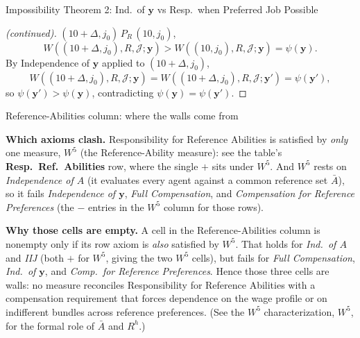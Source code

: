 \documentclass[10pt]{beamer}
\begin{document}
\begin{frame}[allowframebreaks]{Impossibility Theorem 2: Ind.\ of $\mathbf y$ vs Resp.\ when Preferred Job Possible}
\begin{proof}[(continued)]
$(10+\Delta,j_0)\,P_R\,(10,j_0)$,
\begin{equation*}
W((10+\Delta,j_0),R,\mathcal J;\mathbf y)>W((10,j_0),R,\mathcal J;\mathbf y)
=\psi(\mathbf y).
\end{equation*}
By Independence of $\mathbf y$ applied to $(10+\Delta,j_0)$,
\begin{equation*}
W((10+\Delta,j_0),R,\mathcal J;\mathbf y)
=W((10+\Delta,j_0),R,\mathcal J;\mathbf y')=\psi(\mathbf y'),
\end{equation*}
so $\psi(\mathbf y')>\psi(\mathbf y)$, contradicting $\psi(\mathbf
y)=\psi(\mathbf y')$.
\end{proof}

\medskip
\hyperlink{tab:classification}{}
\end{frame}

\begin{frame}[allowframebreaks]{Reference-Abilities column: where the walls come from}
\hypertarget{imp:refabil}{}%
\hyperlink{tab:classification}{}

\scriptsize
\normalsize
\textbf{Which axioms clash.} Responsibility for Reference Abilities is satisfied by
\emph{only} one measure, $W^5$ (the Reference-Ability measure): see the table's
\textbf{Resp.\ Ref.\ Abilities} row, where the single $+$ sits under $W^5$.
And $W^5$ rests on \emph{Independence of $A$} (it evaluates every agent against a
common reference set $\bar A$), so it fails \emph{Independence of $\mathbf y$},
\emph{Full Compensation}, and \emph{Compensation for Reference Preferences}
(the $-$ entries in the $W^5$ column for those rows).

\medskip
\textbf{Why those cells are empty.} A cell in the Reference-Abilities column is
nonempty only if its row axiom is \emph{also} satisfied by $W^5$. That holds for
\emph{Ind.\ of $A$} and \emph{IIJ} (both $+$ for $W^5$, giving the two $W^5$
cells), but fails for \emph{Full Compensation}, \emph{Ind.\ of $\mathbf y$}, and
\emph{Comp.\ for Reference Preferences}. Hence those three cells are walls: no
measure reconciles Responsibility for Reference Abilities with a compensation
requirement that forces dependence on the wage profile or on indifferent bundles
across reference preferences. (See the $W^5$ characterization, \hyperlink{char:w5}{$W^5$}, for the formal role of $\bar A$ and $R^h$.)


\medskip
\hyperlink{tab:classification}{}
\end{frame}
\end{document}
